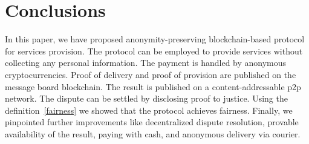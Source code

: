 \documentclass{ieeeaccess}
\begin{document}
\section{Conclusions}\label{sec:conclusion}
In this paper, we have proposed anonymity-preserving blockchain-based protocol for services provision. The protocol can be employed to provide services without collecting any personal information. The payment is handled by anonymous cryptocurrencies. Proof of delivery and proof of provision are published on the message board blockchain. The result is published on a content-addressable p2p network. The dispute can be settled by disclosing proof to justice. 
Using the definition~\ref{fairness} we showed that the protocol achieves fairness. Finally, we pinpointed further improvements like decentralized dispute resolution, provable availability of the result, paying with cash, and anonymous delivery via courier.



\EOD
\end{document}
